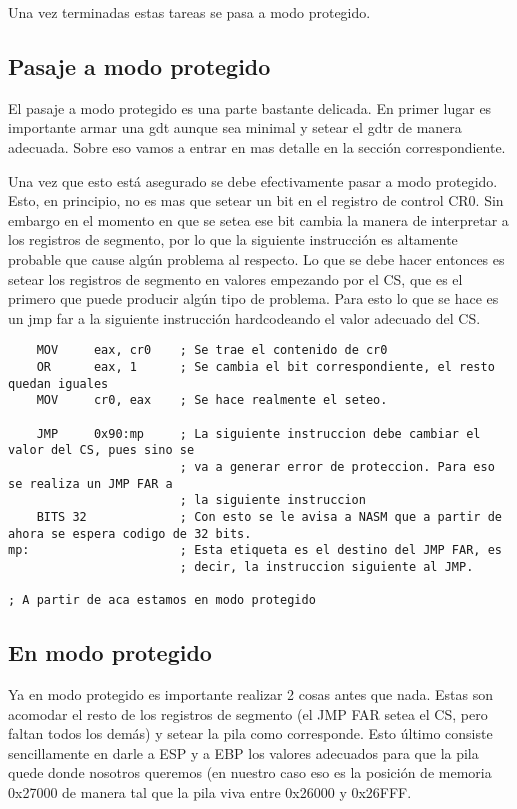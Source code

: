 	Una vez terminadas estas tareas se pasa a modo protegido.

\subsection{Pasaje a modo protegido}

	El pasaje a modo protegido es una parte bastante delicada.
En primer lugar es importante armar una gdt aunque sea minimal y setear
el gdtr de manera adecuada. Sobre eso vamos a entrar en mas detalle
en la sección correspondiente.

	Una vez que esto está asegurado se debe efectivamente pasar
a modo protegido. Esto, en principio, no es mas que setear un bit en el
registro de control CR0. Sin embargo en el momento en que se setea
ese bit cambia la manera de interpretar a los registros de segmento, por lo que
la siguiente instrucción es altamente probable que cause algún problema al
respecto. Lo que se debe hacer entonces es setear los registros de segmento
en valores empezando por el CS, que es el primero que puede producir algún tipo de problema.
Para esto lo que se hace es un jmp far a la siguiente instrucción
hardcodeando el valor adecuado del CS. 

\begin{verbatim}
	MOV		eax, cr0	; Se trae el contenido de cr0
	OR		eax, 1		; Se cambia el bit correspondiente, el resto quedan iguales
	MOV		cr0, eax	; Se hace realmente el seteo.
	
	JMP		0x90:mp		; La siguiente instruccion debe cambiar el valor del CS, pues sino se
						; va a generar error de proteccion. Para eso se realiza un JMP FAR a 
						; la siguiente instruccion
	BITS 32				; Con esto se le avisa a NASM que a partir de ahora se espera codigo de 32 bits.
mp:						; Esta etiqueta es el destino del JMP FAR, es 
						; decir, la instruccion siguiente al JMP.

; A partir de aca estamos en modo protegido
\end{verbatim}

\subsection{En modo protegido}

	Ya en modo protegido es importante realizar 2 cosas
antes que nada. Estas son acomodar el resto de los registros
de segmento (el JMP FAR setea el CS, pero faltan todos los demás)
y setear la pila como corresponde. Esto  último consiste sencillamente
en darle a ESP y a EBP los valores adecuados para que la pila quede
donde nosotros queremos (en nuestro caso eso es la posición de memoria 0x27000
de manera tal que la pila viva entre 0x26000 y 0x26FFF.


